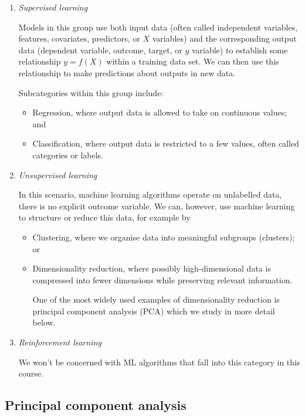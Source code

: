 \documentclass{scrartcl}
\providecommand{\tightlist}{%
      \setlength{\itemsep}{0pt}\setlength{\parskip}{0pt}}
\begin{document}
\begin{enumerate}
\def\labelenumi{\arabic{enumi}.}
\item
  \emph{Supervised learning}

  Models in this group use both input data (often called independent
  variables, features, covariates, predictors, or \(X\) variables) and
  the corresponding output data (dependent variable, outcome, target, or
  \(y\) variable) to establish some relationship \(y = f(X)\) within a
  training data set. We can then use this relationship to make
  predictions about outputs in new data.

  Subcategories within this group include:

  \begin{itemize}
  \tightlist
  \item
    Regression, where output data is allowed to take on continuous
    values; and
  \item
    Classification, where output data is restricted to a few values,
    often called categories or labels.
  \end{itemize}
\item
  \emph{Unsupervised learning}

  In this scenario, machine learning algorithms operate on unlabelled
  data, \ie there is no explicit outcome variable. We can, however,
  use machine learning to structure or reduce this data, for example by

  \begin{itemize}
  \item
    Clustering, where we organise data into meaningful subgroups
    (clusters); or
  \item
    Dimensionality reduction, where possibly high-dimensional data is
    compressed into fewer dimensions while preserving relevant
    information.

    One of the most widely used examples of dimensionality reduction is
    principal component analysis (PCA) which we study in more detail
    below.
  \end{itemize}
\item
  \emph{Reinforcement learning}

  We won't be concerned with ML algorithms that fall into this category
  in this course.
\end{enumerate}


\hypertarget{principal-component-analysis}{%
\subsection{Principal component
analysis}\label{principal-component-analysis}}
\end{document}
